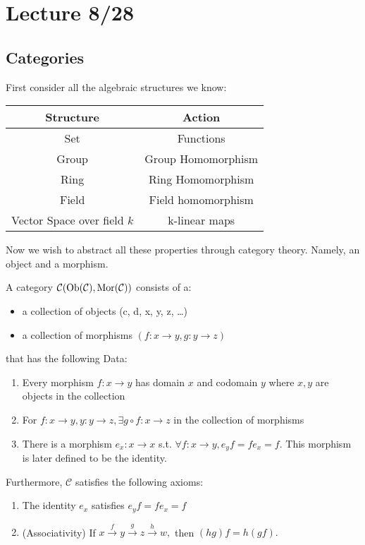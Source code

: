 \section{Lecture 8/28}
\subsection{Categories}
First consider all the algebraic structures we know:

\begin{center}
\begin{tabular}{c|c} \label{table:structure-table}
     Structure & Action \\\hline
     Set & Functions \\\hline
     Group & Group Homomorphism \\\hline
     Ring & Ring Homomorphism \\\hline
     Field & Field homomorphism \\\hline
     Vector Space over field $k$ & k-linear maps \\
\end{tabular}
\end{center}

Now we wish to abstract all these properties through category theory. Namely, an object and a morphism. 

\begin{definition}
    A category $\mathcal{C} (\operatorname{Ob}(\mathcal{C}), \operatorname{Mor}(\mathcal{C}))$  consists of a:
    \begin{itemize}
        \item a collection of objects (c, d, x, y, z, \dots)
        \item a collection of morphisms $(f: x\to y, g: y \to z) $
    \end{itemize}
    that has the following Data:
    \begin{enumerate} [label = D\arabic*\textrangle]
        \item Every morphism $f: x\to y$ has domain $x$ and codomain $y$ where $x,y$ are objects in the collection 
        \item For $f: x\to y, y: y\to z, \exists g \circ f: x \to z$ in the collection of morphisms 
        \item There is a morphism $e_x: x\to x$ s.t. $\forall f: x \to y, e_y f = f e_x = f.$ This morphism is later defined to be the identity.
    \end{enumerate}
     
    Furthermore, $\mathcal{C}$ satisfies the following axioms:
    \begin{enumerate} [label = A\arabic*\textrangle]
        \item The identity $e_x$ satisfies $e_y f = f e_x = f$
        \item (Associativity) If $x \xrightarrow{f} y \xrightarrow{g} z \xrightarrow{h}w,$ then $(hg)f = h(gf).$
    \end{enumerate}

\end{definition}

